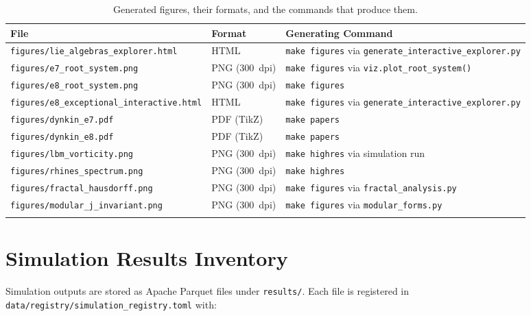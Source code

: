 \begin{longtable}{p{5.5cm}p{2cm}p{5.5cm}}
\toprule
\textbf{File} & \textbf{Format} & \textbf{Generating Command} \\
\midrule
\endhead
\texttt{figures/lie\_algebras\_explorer.html} &
    HTML & \texttt{make figures} via
    \texttt{generate\_interactive\_explorer.py} \\
\texttt{figures/e7\_root\_system.png} &
    PNG (300~dpi) & \texttt{make figures} via \texttt{viz.plot\_root\_system()} \\
\texttt{figures/e8\_root\_system.png} &
    PNG (300~dpi) & \texttt{make figures} \\
\texttt{figures/e8\_exceptional\_interactive.html} &
    HTML & \texttt{make figures} via \texttt{generate\_interactive\_explorer.py} \\
\texttt{figures/dynkin\_e7.pdf} &
    PDF (TikZ) & \texttt{make papers} \\
\texttt{figures/dynkin\_e8.pdf} &
    PDF (TikZ) & \texttt{make papers} \\
\texttt{figures/lbm\_vorticity.png} &
    PNG (300~dpi) & \texttt{make highres} via simulation run \\
\texttt{figures/rhines\_spectrum.png} &
    PNG (300~dpi) & \texttt{make highres} \\
\texttt{figures/fractal\_hausdorff.png} &
    PNG (300~dpi) & \texttt{make figures} via \texttt{fractal\_analysis.py} \\
\texttt{figures/modular\_j\_invariant.png} &
    PNG (300~dpi) & \texttt{make figures} via \texttt{modular\_forms.py} \\
\bottomrule
\caption{Generated figures, their formats, and the commands that produce them.}
\label{tab:figures_inventory}
\end{longtable}

\section{Simulation Results Inventory}
\label{app:results_inventory}

Simulation outputs are stored as Apache Parquet files under
\texttt{results/}.  Each file is registered in
\texttt{data/registry/simulation\_registry.toml} with:

